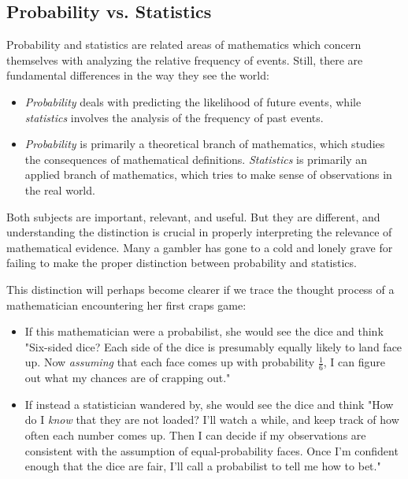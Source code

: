\documentclass[10pt]{article}
\begin{document}
\subsection*{Probability vs. Statistics}

Probability and statistics are related areas of mathematics which concern themselves with analyzing the relative frequency of events. Still, there are fundamental differences in the way they see the world:

\begin{itemize}
    \item \textit{Probability} deals with predicting the likelihood of future events, while \textit{statistics} involves the analysis of the frequency of past events.
    
    \item \textit{Probability} is primarily a theoretical branch of mathematics, which studies the consequences of mathematical definitions. \textit{Statistics} is primarily an applied branch of mathematics, which tries to make sense of observations in the real world.
\end{itemize}

Both subjects are important, relevant, and useful. But they are different, and understanding the distinction is crucial in properly interpreting the relevance of mathematical evidence. Many a gambler has gone to a cold and lonely grave for failing to make the proper distinction between probability and statistics.

This distinction will perhaps become clearer if we trace the thought process of a mathematician encountering her first craps game:

\begin{itemize}
    \item If this mathematician were a probabilist, she would see the dice and think "Six-sided dice? Each side of the dice is presumably equally likely to land face up. Now \textit{assuming} that each face comes up with probability \(\frac{1}{6}\), I can figure out what my chances are of crapping out."
    
    \item If instead a statistician wandered by, she would see the dice and think "How do I \textit{know} that they are not loaded? I’ll watch a while, and keep track of how often each number comes up. Then I can decide if my observations are consistent with the assumption of equal-probability faces. Once I’m confident enough that the dice are fair, I’ll call a probabilist to tell me how to bet."
\end{itemize}
\end{document}
